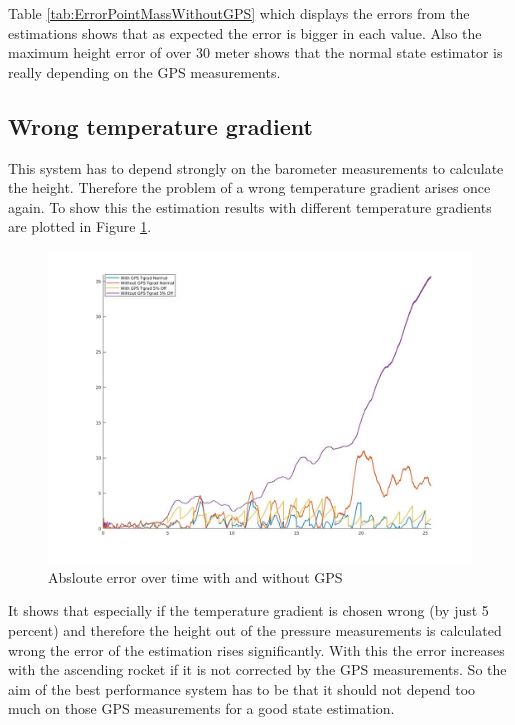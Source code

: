 Table \ref{tab:ErrorPointMassWithoutGPS} which displays the errors from the estimations shows that as expected the error is bigger in each value.
Also the maximum height error of over 30 meter shows that the normal state estimator is really depending on the GPS measurements.

\subsection{Wrong temperature gradient}
This system has to depend strongly on the barometer measurements to calculate the height.
Therefore the problem of a wrong temperature gradient arises once again.
To show this the estimation results with different temperature gradients are plotted in Figure \ref{fig:PointMassWithWithoutGPS}.

\begin{figure}[h!]
 \centering
 \includegraphics[width=.8\textwidth]{./Pictures/PointMassWithWithoutGPS.jpg}
 \caption{Absloute error over time with and without GPS}
 \label{fig:PointMassWithWithoutGPS}
\end{figure}

It shows that especially if the temperature gradient is chosen wrong (by just 5 percent) and
therefore the height out of the pressure measurements is calculated wrong the error of the estimation rises significantly.
With this the error increases with the ascending rocket if it is not corrected by the GPS measurements.
So the aim of the best performance system has to be that it should not depend too much on those GPS measurements for a good state estimation.

\newpage
